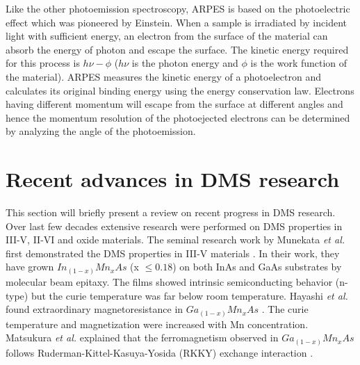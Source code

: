\documentclass[main.tex]{subfiles}
\begin{document}
Like the other photoemission spectroscopy, ARPES is based on the photoelectric effect which was pioneered by Einstein. When a sample is irradiated by incident light with sufficient energy, an electron from the surface of the material can absorb the energy of photon and escape the surface. The kinetic energy required for this process is \(h\nu-\phi\) ($h\nu$ is the photon energy and $\phi$ is the work function of the material). ARPES measures the kinetic energy of a photoelectron and calculates its original binding energy using the energy conservation law. Electrons having different momentum will escape from the surface at different angles and hence the momentum resolution of the photoejected electrons can be determined by analyzing the angle of the photoemission. 

\section{Recent advances in DMS research}

This section will briefly present a review on recent progress in DMS research. Over last few decades extensive research were performed on DMS properties in III-V, II-VI and oxide materials. The seminal research work by Munekata \textit{et al.} first demonstrated the DMS properties in III-V materials \cite{munekata1989diluted}. In their work, they have grown $In_{(1-x)}Mn_{x}As$ (x $\leq 0.18$) on both InAs and GaAs substrates by molecular beam epitaxy. The films showed intrinsic semiconducting behavior (n-type) but the curie temperature was far below room temperature. Hayashi \textit{et al.} found extraordinary magnetoresistance in $Ga_{(1-x)}Mn_{x}As$ \cite{hayashi1997magnetic}. The curie temperature and magnetization were increased with Mn concentration. Matsukura \textit{et al.} explained that the ferromagnetism observed in $Ga_{(1-x)}Mn_{x}As$ follows Ruderman-Kittel-Kasuya-Yosida (RKKY) exchange interaction \cite{matsukura1998transport}.
\end{document}
